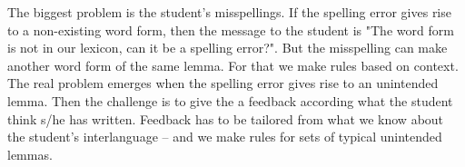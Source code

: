 \documentclass[11pt]{article}
\begin{document}
%
%
%

The biggest problem is the student's misspellings. If the spelling error gives rise to a non-existing word form, then the message to the student is "The word form is not in our lexicon, can it be a spelling error?". But the misspelling can make another word form of the same lemma. For that we make rules based on context. The real problem emerges when the spelling error gives rise to an unintended lemma. Then the challenge is to give the a feedback according what the student think s/he has written. Feedback has to be tailored from what we know about the student’s interlanguage – and we make rules for sets of typical unintended lemmas.
\end{document}

